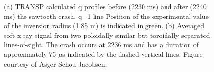 \begin{figure}[h!]
    \centering
    \caption{(a) TRANSP calculated q profiles before (2230 ms) and after (2240 ms) the sawtooth crash. q=1 line Position of the experimental value of the inversion radius (1.85 m) is indicated in green. (b) Averaged soft x-ray signal from two poloidally similar but toroidally separated lines-of-sight. The crash occurs at 2236 ms and has a duration of approximately 75 $\mu$s indicated by the dashed vertical lines. Figure courtesy of Asger Schou Jacobsen. }
\end{figure}

